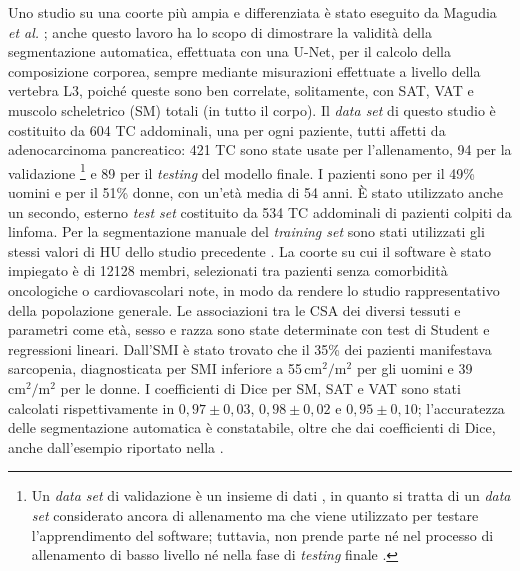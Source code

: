 Uno studio su una coorte più ampia e differenziata è stato eseguito da Magudia \textit{et al.} \cite{Magudia2021}; anche questo lavoro ha lo scopo di dimostrare la validità della segmentazione automatica, effettuata con una U-Net, per il calcolo della composizione corporea, sempre mediante misurazioni effettuate a livello della vertebra L3, poiché queste sono ben correlate, solitamente, con SAT, VAT e muscolo scheletrico (SM) totali (in tutto il corpo). Il \textit{data set} di questo studio è costituito da 604 TC addominali, una per ogni paziente, tutti affetti da adenocarcinoma pancreatico: 421 TC sono state usate per l’allenamento, 94 per la validazione%
\footnote{Un \textit{data set} di validazione è un insieme di dati , in quanto si tratta di un \textit{data set} considerato ancora di allenamento ma che viene utilizzato per testare l’apprendimento del software; tuttavia, non prende parte né nel processo di allenamento di basso livello né nella fase di \textit{testing} finale \cite{sets}.}
e 89 per il \textit{testing} del modello finale. I pazienti sono per il 49\% uomini e per il 51\% donne, con un’età media di 54 anni. È stato utilizzato anche un secondo, esterno \textit{test set} costituito da 534 TC addominali di pazienti colpiti da linfoma. Per la segmentazione manuale del \textit{training set} sono stati utilizzati gli stessi valori di HU dello studio precedente \cite[vedi][]{Borrelli2021}. La coorte su cui il software è stato impiegato è di 12128 membri, selezionati tra pazienti senza comorbidità oncologiche o cardiovascolari note, in modo da rendere lo studio rappresentativo della popolazione generale. Le associazioni tra le CSA dei diversi tessuti e parametri come età, sesso e razza sono state determinate con test di Student e regressioni lineari. Dall’SMI è stato trovato che il 35\% dei pazienti manifestava sarcopenia, diagnosticata per SMI inferiore a 55\,$\mathrm{cm}^2/\mathrm{m}^2$ per gli uomini e 39\,$\mathrm{cm}^2/\mathrm{m}^2$ per le donne. I coefficienti di Dice per SM, SAT e VAT sono stati calcolati rispettivamente in $0,97\pm0,03$, $0,98\pm0,02$ e $0,95\pm0,10$; l'accuratezza delle segmentazione automatica è constatabile, oltre che dai coefficienti di Dice, anche dall'esempio riportato nella .
